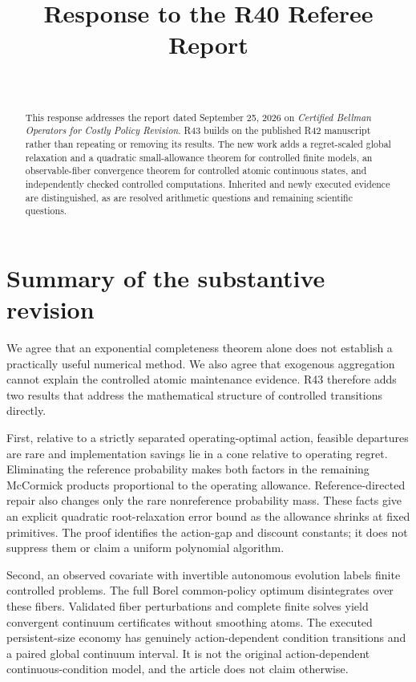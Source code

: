 


\begin{frontmatter}
\title{Response to the R40 Referee Report}
\begin{aug}\author[id=au1,addressref={add1}]{~}\address[id=add1]{}\end{aug}
\begin{abstract}
This response addresses the report dated September 25, 2026 on \emph{Certified Bellman Operators for Costly Policy Revision}. R43 builds on the published R42 manuscript rather than repeating or removing its results. The new work adds a regret-scaled global relaxation and a quadratic small-allowance theorem for controlled finite models, an observable-fiber convergence theorem for controlled atomic continuous states, and independently checked controlled computations. Inherited and newly executed evidence are distinguished, as are resolved arithmetic questions and remaining scientific questions.
\end{abstract}
\end{frontmatter}

\section{Summary of the substantive revision}
We agree that an exponential completeness theorem alone does not establish a practically useful numerical method. We also agree that exogenous aggregation cannot explain the controlled atomic maintenance evidence. R43 therefore adds two results that address the mathematical structure of controlled transitions directly.

First, relative to a strictly separated operating-optimal action, feasible departures are rare and implementation savings lie in a cone relative to operating regret. Eliminating the reference probability makes both factors in the remaining McCormick products proportional to the operating allowance. Reference-directed repair also changes only the rare nonreference probability mass. These facts give an explicit quadratic root-relaxation error bound as the allowance shrinks at fixed primitives. The proof identifies the action-gap and discount constants; it does not suppress them or claim a uniform polynomial algorithm.

Second, an observed covariate with invertible autonomous evolution labels finite controlled problems. The full Borel common-policy optimum disintegrates over these fibers. Validated fiber perturbations and complete finite solves yield convergent continuum certificates without smoothing atoms. The executed persistent-size economy has genuinely action-dependent condition transitions and a paired global continuum interval. It is not the original action-dependent continuous-condition model, and the article does not claim otherwise.

